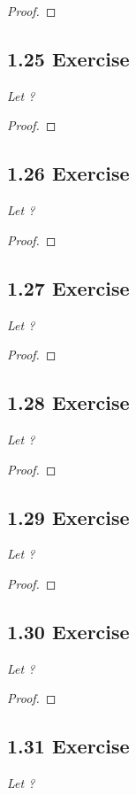 \documentclass{article}
\begin{document}
\begin{proof}
\end{proof}

\subsection*{1.25 Exercise} 
\quad \textit{Let ?}

\begin{proof}
\end{proof}

\subsection*{1.26 Exercise} 
\quad \textit{Let ?}

\begin{proof}
\end{proof}

\subsection*{1.27 Exercise} 
\quad \textit{Let ?}

\begin{proof}
\end{proof}

\subsection*{1.28 Exercise} 
\quad \textit{Let ?}

\begin{proof}
\end{proof}

\subsection*{1.29 Exercise} 
\quad \textit{Let ?}

\begin{proof}
\end{proof}

\subsection*{1.30 Exercise} 
\quad \textit{Let ?}

\begin{proof}
\end{proof}

\subsection*{1.31 Exercise} 
\quad \textit{Let ?}
\end{document}
